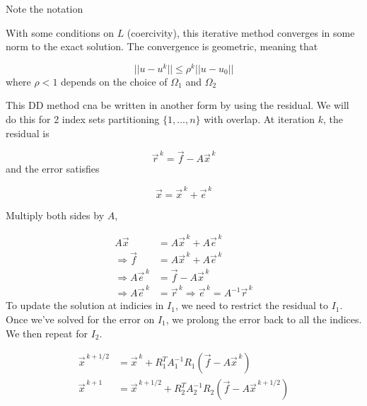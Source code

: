 Note the notation

\begin{center}
    
\end{center}

With some conditions on $L$ (coercivity), this iterative method converges in some norm to the exact solution. The convergence is geometric, meaning that

\begin{equation*}
    || u-u^k|| \leq \rho^k || u-u_0||
\end{equation*}
where $\rho<1$ depends on the choice of $\Omega_1$ and $\Omega_2$


This DD method cna be written in another form by using the residual. We will do this for 2 index sets partitioning $\{ 1, \ldots, n \}$ with overlap. At iteration $k$, the residual is

\begin{equation*}
    \vec{r}^{\, k} = \vec{f} - A\vec{x}^{\, k}
\end{equation*}
and the error satisfies

\begin{equation*}
    \vec{x} = \vec{x}^{\, k} + \vec{e}^{\, k}
\end{equation*}

Multiply both sides by $A$,

\begin{align*}
    A\vec{x} &= A\vec{x}^{\, k} + A\vec{e}^{\, k}\\
    \Rightarrow \vec{f} &= A\vec{x}^{\, k} + A\vec{e}^{\, k}\\
    \Rightarrow A\vec{e}^{\, k} &=\vec{f} - A\vec{x}^{\, k} \\
    \Rightarrow A\vec{e}^{\, k} &=\vec{r}^{\, k}
    \Rightarrow \vec{e}^{\, k} =A^{-1}\vec{r}^{\, k}
\end{align*}
To update the solution at indicies in $I_1$, we need to restrict the residual to $I_1$. Once we've solved for the error on $I_1$, we prolong the error back to all the indices. We then repeat for $I_2$.

\begin{align*}
    \vec{x}^{\, k + 1/2} &= \vec{x}^{\, k} +
    R_1^T A_1^{-1} R_1
    \left(\vec{f} - A\vec{x}^{\, k}\right)\\
    \vec{x}^{\, k + 1} &= \vec{x}^{\, k + 1/2} +
    R_2^T A_2^{-1} R_2
    \left(\vec{f} - A\vec{x}^{\, k + 1/2}\right)\\
\end{align*}


